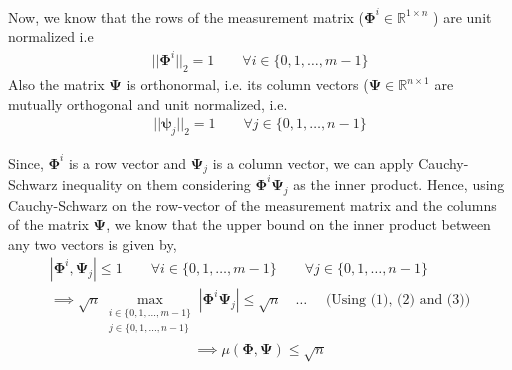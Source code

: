 \documentclass[12pt]{article}
\begin{document}
\noindent Now, we know that the rows of the measurement matrix ($\boldsymbol{\Phi}^i \in \mathbb{R}^{1 \times n}$ ) are unit normalized i.e  
\begin{gather}
||\boldsymbol{\Phi}^i ||_2 = 1 \quad \quad \forall i \in \{0,1,\dots,m-1\} 
\end{gather}
Also the matrix $\boldsymbol{\Psi}$ is orthonormal, i.e. its column vectors ($\boldsymbol{\Psi} \in \mathbb{R}^{n \times 1}$ are mutually orthogonal and unit normalized, i.e. 
\begin{gather}
    ||\boldsymbol{\psi}_j ||_2 = 1 \quad \quad \forall j \in \{0,1,\dots,n-1\} 
\end{gather}

Since, $\boldsymbol{\Phi}^i$ is a row  vector and $\boldsymbol{\Psi}_j$ is a column vector, we can apply Cauchy-Schwarz inequality on them considering $ \boldsymbol{\Phi}^i \boldsymbol{\Psi}_j $ as the inner product. Hence, using Cauchy-Schwarz on the row-vector of the measurement matrix and the columns of the matrix $\boldsymbol{\Psi}$, we know that the upper bound on the inner product between any two vectors is given by,
\begin{gather*}
| \boldsymbol{\Phi}^i, \boldsymbol{\Psi}_j | \leq 1 \quad \quad \forall i \in \{0,1,\dots,m-1\} \quad \quad \forall j \in \{0,1,\dots,n-1\} \\
\implies \sqrt{n} \max_{\substack{i \in \{0,1,...,m-1\}  \\ j \in \{0,1,...,n-1\} }} | \boldsymbol{\Phi}^i \boldsymbol{\Psi}_j | \leq \sqrt{n} \quad \dots \quad\text{ (Using (1), (2) and (3))} 
\end{gather*}
\begin{gather}
\implies \mu(\boldsymbol{\Phi},\boldsymbol{\Psi}) \leq \sqrt{n} 
\end{gather}
\end{document}
